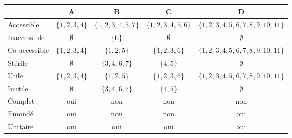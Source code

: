 \begin{corrections}
\begin{questions}
\begin{itemize}
    \end{itemize}

  \end{questions}

\end{corrections}

\begin{corrections}

  \begin{questions}
  \item {\small
    \begin{tabular}[t]{| l | c c c c |}
      \hline
      & A & B & C  & D \\
      \hline
      Accessible          & $\{1,2,3,4\}$ & $\{1, 2, 3, 4, 5, 7\}$  & $\{1, 2, 3, 4, 5, 6\}$  & $\{1, 2, 3, 4, 5, 6, 7, 8, 9, 10, 11\}$ \\
      Inaccessible        & $\emptyset$   & $\{6\}$                 & $\emptyset$             & $\emptyset$                             \\
      Co-accessible       & $\{1,2,3,4\}$ & $\{1, 2, 5\}$           & $\{1, 2, 3, 6\}$        & $\{1, 2, 3, 4, 5, 6, 7, 8, 9, 10, 11\}$ \\
      Stérile             & $\emptyset$   & $\{3, 4, 6, 7\}$        & $\{4, 5\}$              & $\emptyset$                             \\
      Utile               & $\{1,2,3,4\}$ & $\{1, 2, 5\}$           & $\{1, 2, 3, 6\}$        & $\{1, 2, 3, 4, 5, 6, 7, 8, 9, 10, 11\}$ \\
      Inutile             & $\emptyset$   & $\{3, 4, 6, 7\}$        & $\{4, 5\}$              & $\emptyset$                             \\
      Complet             & oui           & non                     & non                     & non                                     \\
      Emondé              & oui           & non                     & non                     & oui                                     \\
      Unitaire            & oui           & oui                     & oui                     & oui                                     \\

\end{tabular}}
\end{questions}
\end{corrections}
